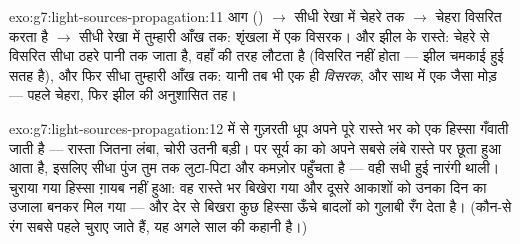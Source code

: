 \begin{solution}{exo:g7:light-sources-propagation:11}
आग () $\to$ सीधी रेखा में चेहरे तक $\to$ चेहरा विसरित
करता है $\to$ सीधी रेखा में तुम्हारी आँख तक: शृंखला में एक विसरक। और
झील के रास्ते: चेहरे से विसरित  सीधा ठहरे पानी तक जाता है, वहाँ
 की तरह लौटता है (विसरित नहीं होता --- झील चमकाई हुई सतह है), और
फिर सीधा तुम्हारी आँख तक: यानी तब भी एक ही \emph{विसरक}, और साथ में एक
 जैसा मोड़ --- पहले चेहरा, फिर झील की अनुशासित तह।
\end{solution}

\begin{solution}{exo:g7:light-sources-propagation:12}
 में से गुज़रती धूप अपने पूरे रास्ते भर  को एक हिस्सा गँवाती
जाती है --- रास्ता जितना लंबा, चोरी उतनी बड़ी।  पर सूर्य का
  को अपने सबसे लंबे रास्ते पर छूता हुआ आता है, इसलिए
सीधा पुंज तुम तक लुटा-पिटा और कमज़ोर पहुँचता है --- वही सधी हुई नारंगी
थाली। चुराया गया हिस्सा ग़ायब नहीं हुआ: वह रास्ते भर बिखेरा गया और
दूसरे आकाशों को उनका दिन का उजाला बनकर मिल गया --- और देर से बिखरा कुछ
हिस्सा ऊँचे बादलों को गुलाबी रँग देता है। (कौन-से रंग सबसे पहले चुराए
जाते हैं, यह अगले साल की कहानी है।)
\end{solution}

